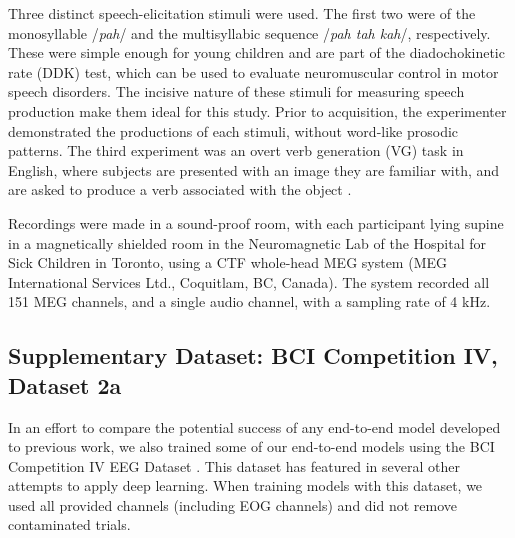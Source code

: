 \documentclass[utf8]{frontiersSCNS} %
\begin{document}

Three distinct speech-elicitation stimuli were used. The first two were of the monosyllable /{\em pah}/ and the multisyllabic sequence /{\em pah tah kah}/, respectively. These were simple enough for young children and are part of the diadochokinetic rate (DDK) test, which can be used to evaluate neuromuscular control in motor speech disorders. The incisive nature of these stimuli for measuring speech production make them ideal for this study. Prior to acquisition, the experimenter demonstrated the productions of each stimuli, without word-like prosodic patterns. The third experiment was an overt verb generation (VG) task in English, where subjects are presented with an image they are familiar with, and are asked to produce a verb associated with the object \cite{Doesburg2016}.

Recordings were made in a sound-proof room, with each participant lying supine in a magnetically shielded room in the Neuromagnetic Lab of the Hospital for Sick Children in Toronto, using a CTF whole-head MEG system (MEG International Services Ltd., Coquitlam, BC, Canada). The system recorded all 151 MEG channels, and a single audio channel, with a sampling rate of 4 kHz.

\subsection{Supplementary Dataset: BCI Competition IV, Dataset 2a}

In an effort to compare the potential success of any end-to-end model developed to previous work, we also trained some of our end-to-end models using the BCI Competition IV EEG Dataset \cite{Tangermann2012}. This dataset has featured in several other attempts to apply deep learning. When training models with this dataset, we used all provided channels (including EOG channels) and did not remove contaminated trials.
\end{document}
